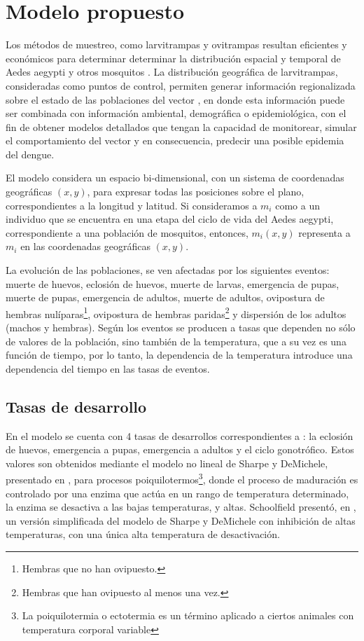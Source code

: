 \section{Modelo propuesto}
Los métodos de muestreo, como larvitrampas y ovitrampas resultan eficientes y económicos para
determinar determinar la distribución espacial y temporal de Aedes aegypti y otros mosquitos
\cite{dengueUruguayCap1, cenaprece2013}. La distribución geográfica de larvitrampas, consideradas
como puntos de control, permiten generar información regionalizada sobre el estado de las
poblaciones del vector \cite{NINO2011}, en donde esta información puede ser combinada con
información ambiental, demográfica o epidemiológica, con el fin de obtener modelos detallados que
tengan la capacidad de monitorear, simular el comportamiento del vector y en consecuencia,
predecir una posible epidemia del dengue.

El modelo considera un espacio bi-dimensional, con un sistema de coordenadas geográficas $(x,y)$,
para expresar todas las posiciones sobre el plano, correspondientes a la longitud y latitud. Si
consideramos a $m_{i}$ como a un individuo que se encuentra en una etapa del ciclo de vida del
Aedes aegypti, correspondiente a una población de mosquitos, entonces, $m_{i}(x,y)$ representa a
$m_{i}$ en las coordenadas geográficas $(x,y)$.

La evolución de las poblaciones, se ven afectadas por los siguientes eventos: muerte de huevos,
eclosión de huevos, muerte de larvas, emergencia de pupas, muerte de pupas, emergencia de adultos,
muerte de adultos, ovipostura de hembras nulíparas\footnote{Hembras que no han ovipuesto.},
ovipostura de hembras paridas\footnote{Hembras que han ovipuesto al menos una vez.} y dispersión
de los adultos (machos y hembras). Según \cite{otero2006stochastic} los eventos se producen a
tasas que dependen no sólo de valores de la población, sino también de la temperatura, que a su
vez es una función de tiempo, por lo tanto, la dependencia de la temperatura introduce una
dependencia del tiempo en las tasas de eventos.

\subsection{Tasas de desarrollo}
En el modelo se cuenta con 4 tasas de desarrollos correspondientes a : la eclosión de huevos,
emergencia a pupas, emergencia a adultos y el ciclo gonotrófico. Estos valores son obtenidos
mediante el modelo no lineal de Sharpe y DeMichele, presentado en \cite{sharpe1977reaction}, para
procesos poiquilotermos\footnote{La poiquilotermia o ectotermia es un término aplicado a ciertos
animales con temperatura corporal variable}, donde el proceso de maduración es controlado por
una enzima que actúa en un rango de temperatura determinado, la enzima se desactiva a las bajas
temperaturas, y altas. Schoolfield presentó, en \cite{schoolfield1981non}, un versión simplificada
del modelo de Sharpe y DeMichele con inhibición de altas temperaturas, con una única alta
temperatura de desactivación.

